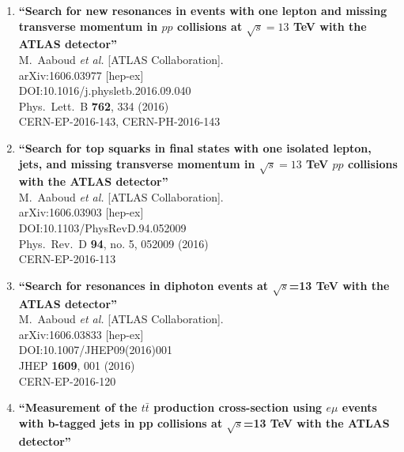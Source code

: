 \documentclass{article}
\begin{document}
\begin{enumerate}
\item%
{\bf ``Search for new resonances in events with one lepton and missing transverse momentum in $pp$ collisions at $\sqrt{s} = 13$ TeV with the ATLAS detector''}
  \\{}M.~Aaboud {\it et al.} [ATLAS Collaboration].
  \\{}arXiv:1606.03977 [hep-ex]
  \\{}DOI:10.1016/j.physletb.2016.09.040
  \\{}Phys.\ Lett.\ B {\bf 762}, 334 (2016)
  \\{}CERN-EP-2016-143, CERN-PH-2016-143
\item%
{\bf ``Search for top squarks in final states with one isolated lepton, jets, and missing transverse momentum in $\sqrt{s}=13$ TeV $pp$ collisions with the ATLAS detector''}
  \\{}M.~Aaboud {\it et al.} [ATLAS Collaboration].
  \\{}arXiv:1606.03903 [hep-ex]
  \\{}DOI:10.1103/PhysRevD.94.052009
  \\{}Phys.\ Rev.\ D {\bf 94}, no. 5, 052009 (2016)
  \\{}CERN-EP-2016-113
\item%
{\bf ``Search for resonances in diphoton events at $\sqrt{s}$=13 TeV with the ATLAS detector''}
  \\{}M.~Aaboud {\it et al.} [ATLAS Collaboration].
  \\{}arXiv:1606.03833 [hep-ex]
  \\{}DOI:10.1007/JHEP09(2016)001
  \\{}JHEP {\bf 1609}, 001 (2016)
  \\{}CERN-EP-2016-120
\item%
{\bf ``Measurement of the $t\bar{t}$ production cross-section using $e\mu$ events with b-tagged jets in pp collisions at $\sqrt{s}$=13 TeV with the ATLAS detector''}

\end{enumerate}
\end{document}
